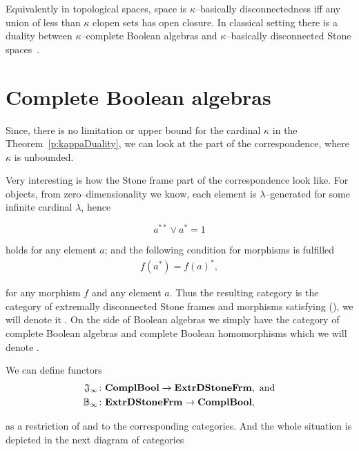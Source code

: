 Equivalently in topological spaces, space is $\kappa$--basically disconnectedness iff any union of less than $\kappa$ clopen sets has open closure. In classical setting there is a duality between $\kappa$--complete Boolean algebras and $\kappa$--basically disconnected Stone spaces~\cite{monk1989handbook}.


\section{Complete Boolean algebras}

Since, there is no limitation or upper bound for the cardinal $\kappa$ in the Theorem~\ref{p:kappaDuality}, we can look at the part of the correspondence, where $\kappa$ is unbounded.

Very interesting is how the Stone frame part of the correspondence look like. For objects, from zero--dimensionality we know, each element is $\lambda$--generated for some infinite cardinal $\lambda$, hence

$$a^{**}\vee a^* = 1$$

\noindent holds for any element $a$; and the following condition for morphisms is fulfilled
\begin{align}
    f(a^*) = f(a)^*,\label{e:no0}
\end{align}

\noindent for any morphism $f$ and any element $a$. Thus the resulting category is the category of extremally disconnected Stone frames and morphisms satisfying (), we will denote it \DEF{\ExtrStoneFrm}. On the side of Boolean algebras we simply have the category of complete Boolean algebras and complete Boolean homomorphisms which we will denote \DEF{\ComplBool}.

We can define functors
\begin{align*}
    \mathfrak{J}_{\infty}&\colon \mathbf{ComplBool} \to \mathbf{ExtrDStoneFrm}, \text{ and} \\
    \mathbb{B}_{\infty}&\colon \mathbf{ExtrDStoneFrm} \to \mathbf{ComplBool},
\end{align*}

\noindent as a restriction of \JO{} and \BcO{} to the corresponding categories. And the whole situation is depicted in the next diagram of categories


